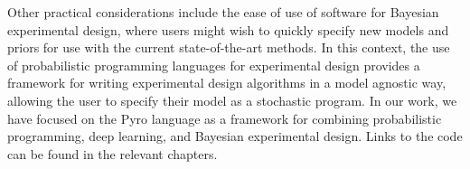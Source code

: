 \documentclass[a4paper, 10pt]{report}
\theoremstyle{plain}
\begin{document}
	
	Other practical considerations include the ease of use of software for Bayesian experimental design, where users might wish to quickly specify new models and priors for use with the current state-of-the-art methods. In this context, the use of probabilistic programming languages for experimental design \citep{ouyang2016} provides a framework for writing experimental design algorithms in a model agnostic way, allowing the user to specify their model as a stochastic program. In our work, we have focused on the Pyro language \citep{pyro} as a framework for combining probabilistic programming, deep learning, and Bayesian experimental design. Links to the code can be found in the relevant chapters.
	
	
	
	
	
	
	
	\clearpage
	
	
	
	
\end{document}
